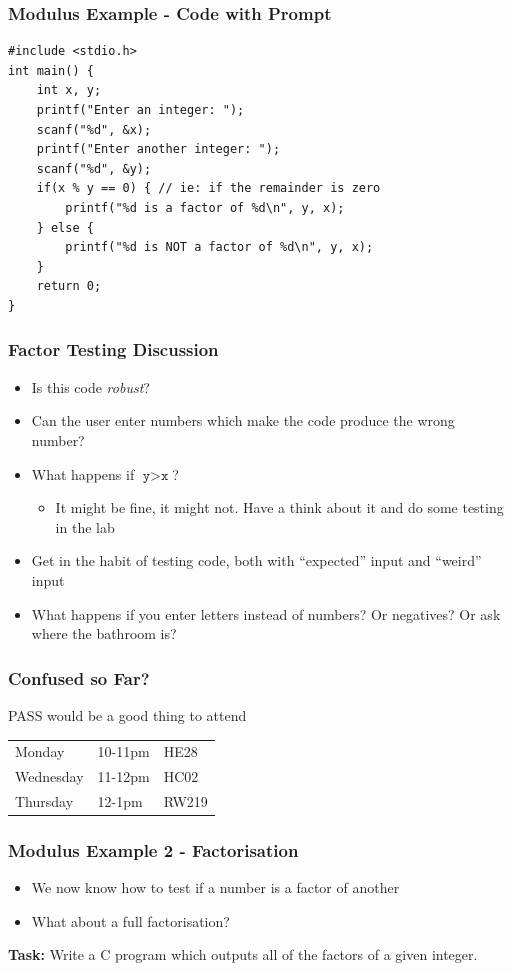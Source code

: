 \documentclass[14pt]{beamer}
\begin{document}
\begin{frame}[fragile]
\frametitle{Modulus Example - Code with Prompt}
\begin{lstlisting}[style=CStyle]
#include <stdio.h>
int main() {
	int x, y;
	printf("Enter an integer: ");
	scanf("%d", &x);
	printf("Enter another integer: ");
	scanf("%d", &y);
	if(x % y == 0) { // ie: if the remainder is zero
		printf("%d is a factor of %d\n", y, x);
	} else {
		printf("%d is NOT a factor of %d\n", y, x);
	}
	return 0;
}
\end{lstlisting}
\end{frame}

\begin{frame}
\frametitle{Factor Testing Discussion}
\begin{itemize}
\item Is this code \textit{robust}?
\item Can the user enter numbers which make the code produce the wrong number?
\item What happens if $\texttt{y}>\texttt{x}$?
	\begin{itemize}
		\item It might be fine, it might not. Have a think about it and do some testing in the lab
	\end{itemize}
\item Get in the habit of testing code, both with ``expected'' input and ``weird'' input
\item What happens if you enter letters instead of numbers? Or negatives? Or ask where the bathroom is?
\end{itemize}
\end{frame}

\begin{frame}
\frametitle{Confused so Far?}
\begin{center}
\huge{PASS would be a good thing to attend}
\end{center}
\begin{table}[]
\begin{tabular}{lll}
Monday    & 10-11pm    & HE28  \\
Wednesday & 11-12pm & HC02  \\
Thursday  & 12-1pm  & RW219
\end{tabular}
\end{table}
\end{frame}

\begin{frame}
\frametitle{Modulus Example 2 - Factorisation}
\begin{itemize}
\item We now know how to test if a number is a factor of another
\item What about a full factorisation?
\end{itemize}

\textbf{Task:} Write a C program which outputs all of the factors of a given integer.
\end{frame}
\end{document}
